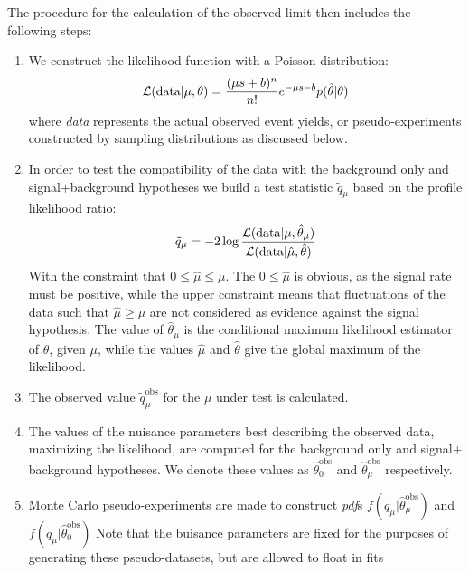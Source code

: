 The procedure for the calculation of the observed limit then includes the
following steps:
\begin{enumerate}
    \item We construct the likelihood function with a Poisson
        distribution:
        \begin{equation*}
            \mathcal{L}(\text{data} | \mu, \theta) = \dfrac{(\mu s +
            b)^n}{n!}e^{-\mu s - b} p(\tilde \theta | \theta)
        \end{equation*}
        where \emph{data} represents the actual observed event yields, or
        pseudo-experiments constructed by sampling distributions as
        discussed below.
    \item In order to test the compatibility of the data with the background
        only and signal$+$background hypotheses we build a test statistic
        $\tilde{q}_\mu$  based on the profile likelihood ratio:
        \begin{equation*}
            \tilde{q}_\mu = -2 \log \dfrac{\mathcal{L}(\text{data}|\mu,
            \hat{\theta}_\mu)}{\mathcal{L}(\text{data}|\hat{\mu},
            \hat{\theta})}
        \end{equation*}
        With the constraint that $0 \leq \hat\mu \leq \mu$. The $0 \leq
        \hat\mu$ is obvious, as the signal rate must be positive, while the
        upper constraint means that fluctuations of the data such that
        $\hat\mu \geq \mu$ are not considered as evidence against the signal
        hypothesis.
        The value of $\hat{\theta}_\mu$ is the conditional maximum
        likelihood estimator of $\theta$, given $\mu$, while the values
        $\hat\mu$ and $\hat\theta$ give the global maximum of the
        likelihood.
    \item The observed value $\tilde{q}_\mu^{\text{obs}}$ for the $\mu$
        under test is calculated.
    \item The values of the nuisance parameters best describing the observed
        data, \ie maximizing the likelihood, are computed for the background
        only and signal$+$background hypotheses. We denote these values as
        $\hat{\theta}_0^{\text{obs}}$ and
        $\hat{\theta}_{\mu}^{\text{obs}}$ respectively.
    \item Monte Carlo pseudo-experiments are made to construct
        \emph{pdf}s $f(\tilde{q}_\mu|\hat{\theta}_{\mu}^{\text{obs}})$ and $f(\tilde{q}_\mu|\hat{\theta}_{0}^{\text{obs}})$ 
        Note that the buisance parameters are fixed for the purposes of
        generating these pseudo-datasets, but are allowed to float in fits

\end{enumerate}
